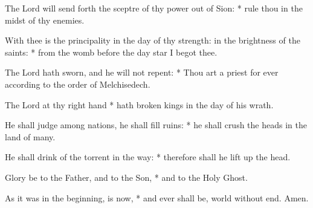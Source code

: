﻿\setcounter{enumi}{2}
\item The Lord will send forth the sceptre of thy power out of Sion: * rule thou in the midst of thy enemies.
\item With thee is the principality in the day of thy strength: in the brightness of the saints: * from the womb before the day star I begot thee.
\item  The Lord hath sworn, and he will not repent: * Thou art a priest for ever according to the order of Melchisedech.
\item  The Lord at thy right hand * hath broken kings in the day of his wrath.
\item  He shall judge among nations, he shall fill ruins: * he shall crush the heads in the land of many.
\item  He shall drink of the torrent in the way: * therefore shall he lift up the head.
\item  Glory be to the Father, and to the Son, * and to the Holy Ghost.
\item  As it was in the beginning, is now, * and ever shall be, world without end. Amen.
